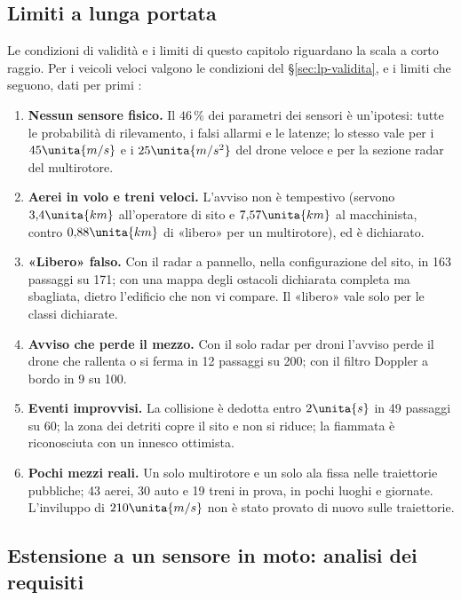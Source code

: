 \subsection{Limiti a lunga portata}\label{sec:lim-lunga}

Le condizioni di validità e i limiti di questo capitolo riguardano la scala a corto raggio. Per i veicoli veloci valgono le condizioni del \S\ref{sec:lp-validita}, e i limiti che seguono, dati per primi :
\begin{enumerate}[label=L\arabic*.,leftmargin=2.2em]
\item \textbf{Nessun sensore fisico.} Il $46\,\%$ dei parametri dei sensori è un'ipotesi: tutte le probabilità di rilevamento, i falsi allarmi e le latenze; lo stesso vale per i $45\unita{m/s}$ e i $25\unita{m/s^2}$ del drone veloce e per la sezione radar del multirotore.
\item \textbf{Aerei in volo e treni veloci.} L'avviso non è tempestivo (servono $3{,}4\unita{km}$ all'operatore di sito e $7{,}57\unita{km}$ al macchinista, contro $0{,}88\unita{km}$ di «libero» per un multirotore), ed è dichiarato.
\item \textbf{«Libero» falso.} Con il radar a pannello, nella configurazione del sito, in 163 passaggi su 171; con una mappa degli ostacoli dichiarata completa ma sbagliata, dietro l'edificio che non vi compare. Il «libero» vale solo per le classi dichiarate.
\item \textbf{Avviso che perde il mezzo.} Con il solo radar per droni l'avviso perde il drone che rallenta o si ferma in 12 passaggi su 200; con il filtro Doppler a bordo in 9 su 100.
\item \textbf{Eventi improvvisi.} La collisione è dedotta entro $2\unita{s}$ in 49 passaggi su 60; la zona dei detriti copre il sito e non si riduce; la fiammata è riconosciuta con un innesco ottimista.
\item \textbf{Pochi mezzi reali.} Un solo multirotore e un solo ala fissa nelle traiettorie pubbliche; 43 aerei, 30 auto e 19 treni in prova, in pochi luoghi e giornate. L'inviluppo di $210\unita{m/s}$ non è stato provato di nuovo sulle traiettorie.
\end{enumerate}

\subsection{Estensione a un sensore in moto: analisi dei requisiti}\label{sec:lim-moto}

